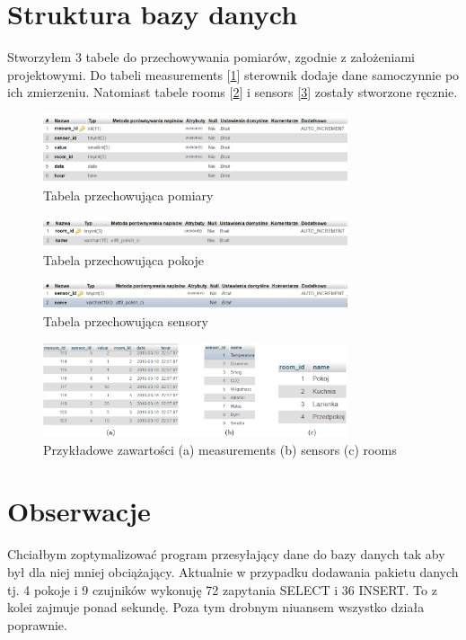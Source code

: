 \documentclass[10pt, a4paper]{article}
\begin{document}
\section{Struktura bazy danych}
	Stworzyłem 3 tabele do przechowywania pomiarów, zgodnie z założeniami projektowymi. Do tabeli measurements [\ref{Measurements}] sterownik dodaje dane samoczynnie po ich zmierzeniu. Natomiast tabele rooms [\ref{Rooms}] i sensors [\ref{Sensors}] zostały stworzone ręcznie.
	\begin{figure}[H]
		\centering
		\includegraphics[width=0.8\textwidth]{figures/measurements.png}
		\caption{Tabela przechowująca pomiary}
		\label{Measurements}
	\end{figure}

	\begin{figure}[H]
		\centering
		\includegraphics[width=0.8\textwidth]{figures/rooms.png}
		\caption{Tabela przechowująca pokoje}
		\label{Rooms}
	\end{figure}

	\begin{figure}[H]
		\centering
		\includegraphics[width=0.8\textwidth]{figures/sensors.png}
		\caption{Tabela przechowująca sensory}
		\label{Sensors}
	\end{figure}

	\begin{figure}[H]
		\centering
		\includegraphics[width=0.8\textwidth]{figures/tabela.png}
		\caption{Przykładowe zawartości (a) measurements (b) sensors (c) rooms }
		\label{Sensors12}
	\end{figure}

\section{Obserwacje}
Chciałbym zoptymalizować program przesyłający dane do bazy danych tak aby był dla niej mniej obciążający. Aktualnie w przypadku dodawania pakietu danych tj. 4 pokoje i 9 czujników wykonuję 72 zapytania SELECT i 36 INSERT. To z kolei zajmuje ponad sekundę. Poza tym drobnym niuansem wszystko działa poprawnie.

	
\end{document}
